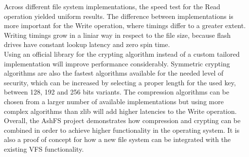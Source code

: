 \documentclass[conference]{IEEEtran}
\begin{document}
Across different file system implementations, the speed test for the Read operation yielded uniform results.
The difference between implementations is more important for the Write operation, where timings differ to a greater
extent. Writing timings grow in a liniar way in respect to the file size, because flash drives have constant lookup
latency and zero spin time.\\ 

Using an official library for the crypting algorithm instead of a custom tailored implementation will
improve performance considerably. Symmetric crypting algorithms are also the fastest algorithms available for the
needed level of security, which can be increased by selecting a proper length for the used key, between 128, 192 and 256
bits variants. The compression algorithms can be chosen from a larger number of available implementations but using more
complex algorithms than zlib will add higher latencies to the Write operation.\\

Overall, the AshFS project demonstrates how compression and crypting can be combined in order to achieve higher
functionality in the operating system. It is also a proof of concept for how a new file system can be integrated with
the existing VFS functionality.



%
%
\end{document}
